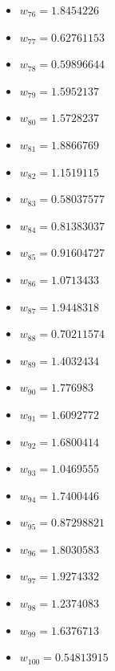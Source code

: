 \documentclass[11pt]{article}
\begin{document}
\begin{itemize}
\item $w_{76} = 1.8454226$
\item $w_{77} = 0.62761153$
\item $w_{78} = 0.59896644$
\item $w_{79} = 1.5952137$
\item $w_{80} = 1.5728237$
\item $w_{81} = 1.8866769$
\item $w_{82} = 1.1519115$
\item $w_{83} = 0.58037577$
\item $w_{84} = 0.81383037$
\item $w_{85} = 0.91604727$
\item $w_{86} = 1.0713433$
\item $w_{87} = 1.9448318$
\item $w_{88} = 0.70211574$
\item $w_{89} = 1.4032434$
\item $w_{90} = 1.776983$
\item $w_{91} = 1.6092772$
\item $w_{92} = 1.6800414$
\item $w_{93} = 1.0469555$
\item $w_{94} = 1.7400446$
\item $w_{95} = 0.87298821$
\item $w_{96} = 1.8030583$
\item $w_{97} = 1.9274332$
\item $w_{98} = 1.2374083$
\item $w_{99} = 1.6376713$
\item $w_{100} = 0.54813915$
\end{itemize}
\end{document}
